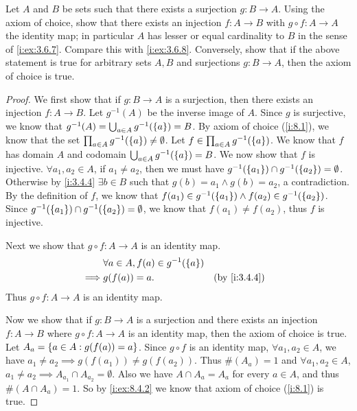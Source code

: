 \begin{ex}\label{i:ex:8.4.3}
  Let \(A\) and \(B\) be sets such that there exists a surjection \(g : B \to A\).
  Using the axiom of choice, show that there exists an injection \(f: A \to B\) with \(g \circ f : A \to A\) the identity map;
  in particular \(A\) has lesser or equal cardinality to \(B\) in the sense of \cref{i:ex:3.6.7}.
  Compare this with \cref{i:ex:3.6.8}.
  Conversely, show that if the above statement is true for arbitrary sets \(A, B\) and surjections \(g : B \to A\), then the axiom of choice is true.
\end{ex}

\begin{proof}
  We first show that if \(g : B \to A\) is a surjection, then there exists an injection \(f : A \to B\).
  Let \(g^{-1}(A)\) be the inverse image of \(A\).
  Since \(g\) is surjective, we know that \(g^{-1}(A) = \bigcup_{a \in A} g^{-1}(\left\lbrace a\right\rbrace) = B\).
  By axiom of choice (\cref{i:8.1}), we know that the set \(\prod_{a \in A} g^{-1}(\left\lbrace a\right\rbrace) \neq \emptyset\).
  Let \(f \in \prod_{a \in A} g^{-1}(\left\lbrace a\right\rbrace)\).
  We know that \(f\) has domain \(A\) and codomain \(\bigcup_{a \in A} g^{-1}(\left\lbrace a\right\rbrace) = B\).
  We now show that \(f\) is injective.
  \(\forall a_1, a_2 \in A\), if \(a_1 \neq a_2\), then we must have \(g^{-1}(\left\lbrace a_1\right\rbrace) \cap g^{-1}(\left\lbrace a_2\right\rbrace) = \emptyset\).
  Otherwise by \cref{i:3.4.4} \(\exists b \in B\) such that \(g(b) = a_1 \land g(b) = a_2\), a contradiction.
  By the definition of \(f\), we know that \(f(a_1) \in g^{-1}(\left\lbrace a_1\right\rbrace) \land f(a_2) \in g^{-1}(\left\lbrace a_2\right\rbrace)\).
  Since \(g^{-1}(\left\lbrace a_1\right\rbrace) \cap g^{-1}(\left\lbrace a_2\right\rbrace) = \emptyset\), we know that \(f(a_1) \neq f(a_2)\), thus \(f\) is injective.

  Next we show that \(g \circ f : A \to A\) is an identity map.
  \begin{align*}
             & \forall a \in A, f(a) \in g^{-1}(\set{a})                   \\
    \implies & g(f(a)) = a.                              &  & \by{i:3.4.4}
  \end{align*}
  Thus \(g \circ f : A \to A\) is an identity map.

  Now we show that if \(g : B \to A\) is a surjection and there exists an injection \(f : A \to B\) where \(g \circ f : A \to A\) is an identity map, then the axiom of choice is true.
  Let \(A_a = \left\lbrace a \in A : g(f(a)) = a\right\rbrace\).
  Since \(g \circ f\) is an identity map, \(\forall a_1, a_2 \in A\), we have \(a_1 \neq a_2 \implies g(f(a_1)) \neq g(f(a_2))\).
  Thus \(\#(A_a) = 1\) and \(\forall a_1, a_2 \in A\), \(a_1 \neq a_2 \implies A_{a_1} \cap A_{a_2} = \emptyset\).
  Also we have \(A \cap A_a = A_a\) for every \(a \in A\), and thus \(\#(A \cap A_a) = 1\).
  So by \cref{i:ex:8.4.2} we know that axiom of choice (\cref{i:8.1}) is true.
\end{proof}
